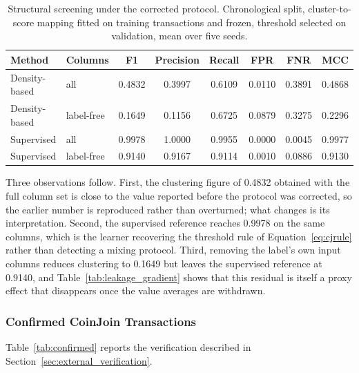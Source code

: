 \documentclass[12pt,a4paper]{article}
\begin{document}
\begin{table}[htbp]
\centering
\small
\caption{Structural screening under the corrected protocol.
Chronological split, cluster-to-score mapping fitted on training
transactions and frozen, threshold selected on validation, mean
over five seeds.}
\label{tab:screening_results}
\begin{tabular}{llcccccc}
\toprule
Method & Columns & F1 & Precision & Recall & FPR & FNR & MCC \\
\midrule
Density-based & all           & 0.4832 & 0.3997 & 0.6109 & 0.0110 & 0.3891 & 0.4868 \\
Density-based & label-free    & 0.1649 & 0.1156 & 0.6725 & 0.0879 & 0.3275 & 0.2296 \\
Supervised    & all           & 0.9978 & 1.0000 & 0.9955 & 0.0000 & 0.0045 & 0.9977 \\
Supervised    & label-free    & 0.9140 & 0.9167 & 0.9114 & 0.0010 & 0.0886 & 0.9130 \\
\bottomrule
\end{tabular}
\end{table}

Three observations follow. First, the clustering figure of 0.4832
obtained with the full column set is close to the value reported
before the protocol was corrected, so the earlier number is
reproduced rather than overturned; what changes is its
interpretation. Second, the supervised reference reaches 0.9978
on the same columns, which is the learner recovering the
threshold rule of Equation~\eqref{eq:cjrule} rather than
detecting a mixing protocol. Third, removing the label's own
input columns reduces clustering to 0.1649 but leaves the
supervised reference at 0.9140, and
Table~\ref{tab:leakage_gradient} shows that this residual is
itself a proxy effect that disappears once the value averages are
withdrawn.

\subsubsection{Confirmed CoinJoin Transactions}
\label{sec:confirmed_results}

Table~\ref{tab:confirmed} reports the verification described in
Section~\ref{sec:external_verification}.
\end{document}

